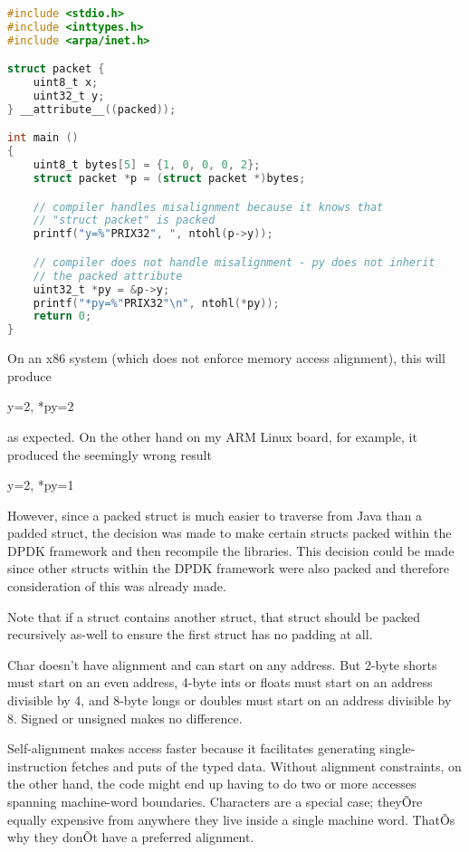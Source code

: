 \documentclass[final_report.tex]{subfiles}
\begin{document}
\begin{lstlisting}[language=C, caption={Example C Struct with compiler inserted padding}, label=lst:c_padded_struct]
#include <stdio.h>
#include <inttypes.h>
#include <arpa/inet.h>

struct packet {
    uint8_t x;
    uint32_t y;
} __attribute__((packed));

int main ()
{
    uint8_t bytes[5] = {1, 0, 0, 0, 2};
    struct packet *p = (struct packet *)bytes;

    // compiler handles misalignment because it knows that
    // "struct packet" is packed
    printf("y=%"PRIX32", ", ntohl(p->y));

    // compiler does not handle misalignment - py does not inherit
    // the packed attribute
    uint32_t *py = &p->y;
    printf("*py=%"PRIX32"\n", ntohl(*py));
    return 0;
}
\end{lstlisting}

On an x86 system (which does not enforce memory access alignment), this will produce

y=2, *py=2

as expected. On the other hand on my ARM Linux board, for example, it produced the seemingly wrong result

y=2, *py=1

However, since a packed struct is much easier to traverse from Java than a padded struct, the decision was made to make certain structs packed within the DPDK framework and then recompile the libraries. This decision could be made since other structs within the DPDK framework were also packed and therefore consideration of this was already made.

Note that if a struct contains another struct, that struct should be packed recursively as-well to ensure the first struct has no padding at all.

Char doesn't have alignment and can start on any address. But 2-byte shorts must start on an even address, 4-byte ints or floats must start on an address divisible by 4, and 8-byte longs or doubles must start on an address divisible by 8. Signed or unsigned makes no difference.

Self-alignment makes access faster because it facilitates generating single-instruction fetches and puts of the typed data. Without alignment constraints, on the other hand, the code might end up having to do two or more accesses spanning machine-word boundaries. Characters are a special case; theyÕre equally expensive from anywhere they live inside a single machine word. ThatÕs why they donÕt have a preferred alignment.
\end{document}
